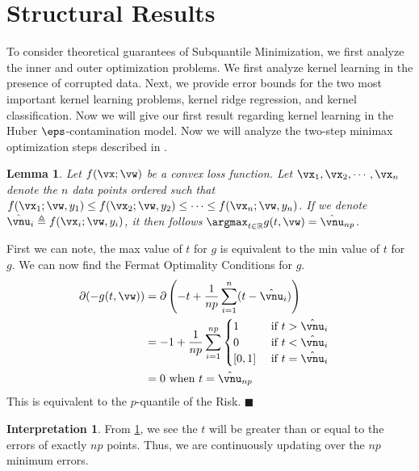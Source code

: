 \documentclass{article} %
\theoremstyle{plain}
\newtheorem{lemma}[thm]{Lemma}
\theoremstyle{definition}
\newtheorem{interpretation}[thm]{Interpretation}
\theoremstyle{remark}
\newcommand{\ccref}[1]{\textcolor{black}{\cref{#1}}}
\newcommand{\Ccref}[1]{\textcolor{black}{\Cref{#1}}}
\begin{document}
	\section{Structural Results}
	To consider theoretical guarantees of Subquantile Minimization, we first analyze the inner and outer optimization problems. We first analyze kernel learning in the presence of corrupted data. Next, we provide error bounds for the two most important kernel learning problems, kernel ridge regression, and kernel classification. 
    Now we will give our first result regarding kernel learning in the Huber $\eps$-contamination model. 
	Now we will analyze the two-step minimax optimization steps described in \Ccref{eqn:t-update,eqn:theta-update}. 
	\begin{lemma}
		\label{lem:t-update}
		Let $f(\vx;\vw)$ be a convex loss function. Let $\vx_1,\vx_2,\cdots,\vx_n$ denote the $n$ data points ordered such that $f(\vx_1;\vw,y_1) \leq f(\vx_2;\vw,y_2) \leq \cdots \leq f(\vx_n;\vw,y_n)$. If we denote $\hat{\vnu}_i \triangleq f(\vx_i;\vw,y_i)$, it then follows $\argmax_{t \in \mathbb{R}}g(t,\vw) = \hat{\vnu}_{np}$.
	\end{lemma}
		First we can note, the max value of $t$ for $g$ is equivalent to the min value of $t$ for $g$. We can now find the Fermat Optimality Conditions for $g$. 
		\begin{align}
			\partial(-g(t,\vw)) &= \partial\left(-t + \frac{1}{np}\sum_{i=1}^{n}(t - \hat{\vnu}_i)\right) &&\\
			&= -1 + \frac{1}{np}\sum_{i=1}^{np}\begin{cases}
				1 & \text{ if } t > \hat{\vnu}_i \\
				0 & \text{ if } t < \hat{\vnu}_i \\
				[0,1] & \text{ if } t = \hat{\vnu}_i
			\end{cases} &&\\
			&= 0 \text{ when } t = \hat{\vnu}_{np}
		\end{align}
		This is equivalent to the $p$-quantile of the Risk.
	\hfill $\blacksquare$
	\begin{interpretation}
		From \ccref{lem:t-update}, we see the $t$ will be greater than or equal to the errors of exactly $np$ points. Thus, we are continuously updating over the $np$ minimum errors.  
	\end{interpretation}
	
\end{document}

